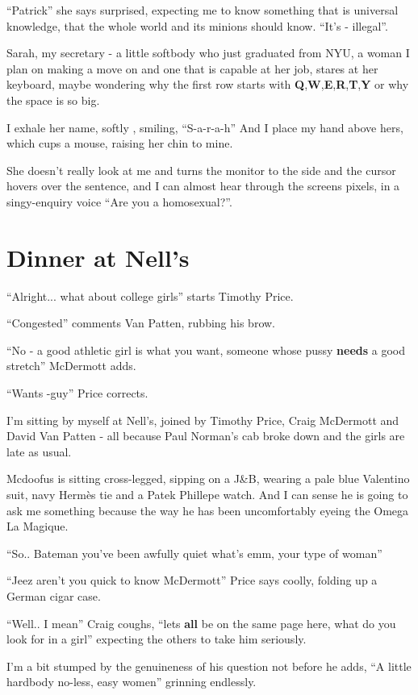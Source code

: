 \documentclass[19pt,openany]{book}
\begin{document}
``Patrick'' she says surprised, expecting
me to know something that is universal
knowledge, that the whole world and
its minions should know. ``It's -
illegal''.

Sarah, my secretary - a
little softbody who
just graduated from NYU, a woman
I plan on making a move on and one that
is capable at her job, stares at her
keyboard, maybe wondering why the first
row starts with \textbf{Q},\textbf{W},\textbf{E},\textbf{R},\textbf{T},\textbf{Y} or why
the space is so big.

I exhale her name, softly , smiling, ``S-a-r-a-h''
And I place my hand above hers, which
cups a mouse, raising her chin
to mine.

She doesn't really look at me and turns
the monitor to the side and the
cursor hovers over the sentence,
and I can almost hear
through the screens pixels,
in a singy-enquiry voice ``Are
you a homosexual?''.

\chapter{Dinner at Nell's}
``Alright...
what about college girls''
starts Timothy Price.

``Congested'' comments Van Patten,
rubbing his brow.

``No - a good athletic girl
is what you want, someone
whose pussy \textbf{needs} a good
stretch'' McDermott adds.

``Wants -guy'' Price corrects.

I'm sitting by myself at Nell's,
joined by Timothy Price, Craig
McDermott and David Van Patten -
all because Paul Norman's cab
broke down and the girls are late
as usual.

Mcdoofus is sitting cross-legged,
sipping on a J\&B, wearing a pale
blue Valentino suit, navy Hermès tie
and a Patek Phillepe watch. And I can sense he
is going to ask me something because
the way he has been uncomfortably
eyeing the Omega La Magique.

``So.. Bateman you've been
awfully quiet what's
emm, your type of woman''

``Jeez aren't you quick to
know McDermott'' Price
says coolly, folding up a
German cigar case.

``Well.. I mean'' Craig
coughs, ``lets \textbf{all}
be on the same page here,
what do you look for in a girl''
expecting the others to take him
seriously.

I'm a bit stumped by the genuineness
of his question not before
he adds, ``A little hardbody
no-less, easy women'' grinning
endlessly.
\end{document}
